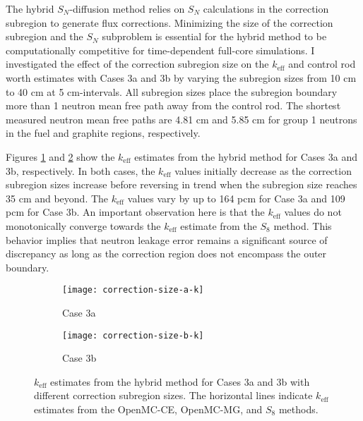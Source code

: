 The hybrid $S_N$-diffusion method relies on $S_N$ calculations in the correction subregion to
generate flux corrections. Minimizing the size of the correction subregion and the $S_N$ subproblem
is essential for the hybrid method to be computationally competitive for time-dependent full-core
simulations. I investigated the effect of the correction subregion size on the $k_\text{eff}$ and
control rod worth estimates with Cases 3a and 3b by varying the subregion sizes from 10 cm to 40 cm
at 5 cm-intervals. All subregion sizes place the subregion boundary more than 1 neutron mean free
path away from the control rod. The shortest measured neutron mean free paths are 4.81 cm and 5.85
cm for group 1 neutrons in the fuel and graphite regions, respectively.

Figures \ref{fig:v1-size-a-k} and \ref{fig:v1-size-b-k} show the $k_\text{eff}$ estimates from the
hybrid method for Cases 3a and 3b, respectively. In both cases, the $k_\text{eff}$ values initially
decrease as the correction subregion sizes increase before reversing in trend when the subregion
size reaches 35 cm and beyond. The $k_\text{eff}$ values vary by up to 164 pcm for Case 3a and 109
pcm for Case 3b. An important observation here is that the $k_\text{eff}$ values do not
monotonically converge towards the $k_\text{eff}$ estimate from the $S_8$ method. This behavior
implies that neutron leakage error remains a significant source of discrepancy as long as the
correction region does not encompass the outer boundary.


\begin{figure}[htb!]
  \centering
  \begin{subfigure}[b]{0.49\columnwidth}
    \centering
    \texttt{[image: correction-size-a-k]}
    \caption{Case 3a}
    \label{fig:v1-size-a-k}
  \end{subfigure}
  \hfill
  \begin{subfigure}[b]{0.49\columnwidth}
    \centering
    \texttt{[image: correction-size-b-k]}
    \caption{Case 3b}
    \label{fig:v1-size-b-k}
  \end{subfigure}
  \caption{$k_\text{eff}$ estimates from the hybrid method for Cases 3a and 3b with different
  correction subregion sizes. The horizontal lines indicate $k_\text{eff}$ estimates from the
  OpenMC-CE, OpenMC-MG, and $S_8$ methods.}
  \label{fig:v1-size-k}
\end{figure}

